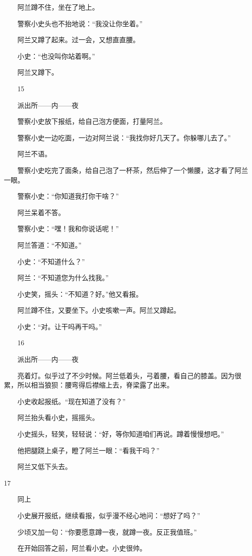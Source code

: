 　　阿兰蹲不住，坐在了地上。 

　　警察小史头也不抬地说：“我没让你坐着。” 

　　阿兰又蹲了起来。过一会，又想直直腰。 

　　小史：“也没叫你站着啊。” 

　　阿兰又蹲下。 

　　15 

　　派出所——内——夜 

　　警察小史放下报纸，给自己泡方便面，打量阿兰。 

　　警察小史一边吃面，一边对阿兰说：“我找你好几天了。你躲哪儿去了。” 

　　阿兰不语。 

　　警察小史吃完了面条，给自己泡了一杯茶，然后伸了一个懒腰，这才看了阿兰一眼。 

　　警察小史：“你知道我打你干啥？” 

　　阿兰呆着不答。 

　　警察小史：“嘿！我和你说话呢！” 

　　阿兰答道：“不知道。” 

　　小史：“不知道什么？” 

　　阿兰：“不知道您为什么找我。” 

　　小史笑，摇头：“不知道？好。”他又看报。 

　　阿兰蹲不住，又要坐下。小史咳嗽一声。阿兰又蹲起。 

　　小史：“对。让干吗再干吗。” 

　　16 

　　派出所——内——夜 

　　亮着灯。似乎过了不少时候。阿兰低着头，弓着腰，看自己的膝盖。因为很累，所以相当狼狈：腰弯得后襟缩上去，脊梁露了出来。 

　　小史收起报纸。“现在知道了没有？” 

　　阿兰抬头看小史，摇摇头。 

　　小史摇头，轻笑，轻轻说：“好，等你知道咱们再说。蹲着慢慢想吧。” 

　　他把腿跷上桌子，瞪了阿兰一眼：“看我干吗？” 

　　阿兰又低下头去。 

17 

　　同上 

　　小史展开报纸，继续看报，似乎漫不经心地问：“想好了吗？” 

　　少顷又加一句：“你要愿意蹲一夜，就蹲一夜。反正我值班。” 

　　在开始回答之前，阿兰看小史。小史很帅。 

